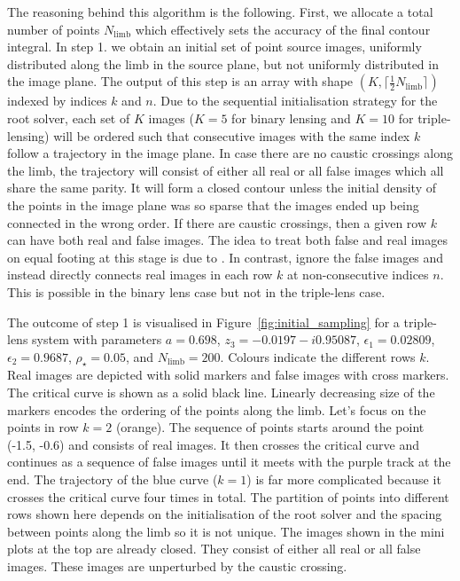 \documentclass[12pt,dvipsnames]{report}
\begin{document}
The reasoning behind this algorithm is the following. First, we allocate a total number
of points $N_\mathrm{limb}$ which effectively sets the accuracy of the final contour integral.
In step 1. we obtain an initial set of point source images, uniformly distributed along the limb 
in the source plane, but not uniformly distributed in the image plane. The output of this step 
is an array with shape $(K, \lceil\frac{1}{2}N_\mathrm{limb}\rceil)$ indexed by indices $k$ and $n$.
Due to the sequential initialisation strategy for the root solver, each set of $K$ images 
($K=5$ for binary lensing and $K=10$ for triple-lensing) will be ordered such that 
consecutive images with the same index $k$ follow a trajectory in the image plane. In case 
there are no caustic crossings along the limb, the trajectory will consist of either all 
real or all false images which all share the same parity.
It will
form a closed contour unless the initial density of the points in the image plane was so sparse
that the images ended up being connected in the wrong order. 
If there are caustic crossings,
then a given row $k$ can have both real and false images.
The idea to treat both false and real images on equal footing at this stage is due to 
\citet{2021MNRAS.503.6143K}. In contrast, \citet{2010MNRAS.408.2188B} ignore the false images and 
instead directly connects real images in each row $k$ at non-consecutive indices $n$.
This is possible in the binary lens case but not in the triple-lens case. 

The outcome of step 1 is visualised in Figure~\ref{fig:initial_sampling} for a triple-lens 
system with parameters $a=0.698$, $z_3=-0.0197 - i0.95087$, $\epsilon_1=0.02809$, 
$\epsilon_2=0.9687$, $\rho_\star=0.05$, and $N_\mathrm{limb}=200$. 
Colours indicate the different rows $k$. Real images are depicted with solid markers and 
false images with cross markers. The critical curve is shown as a solid black line. Linearly 
decreasing size of the markers encodes the ordering of the points along the limb.
Let's focus on the points in row $k=2$ (orange). The sequence of points starts around the 
point (-1.5, -0.6) and consists  of real images. It then crosses the critical curve and 
continues as a sequence of false images until it meets with the purple track at the end. 
The trajectory of the blue curve ($k=1$) is far more complicated because 
it crosses the critical curve four times in total. The partition of points into different rows
shown here depends on the initialisation of the root solver and the spacing between points along 
the limb so it is not unique. The images shown in the mini plots at the top are already closed.
They consist of either all real or all false images. These images are unperturbed by the caustic crossing.
\end{document}
